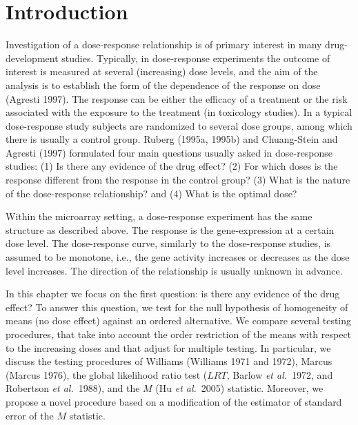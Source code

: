 \chapter{Introduction}
 \label{chap: intro}

Investigation of a dose-response relationship is of primary interest
in many drug-development studies. Typically, in dose-response
experiments the outcome of interest is measured at several
(increasing) dose levels, and the aim  of the analysis is to
establish the form of the dependence of the response on dose
(Agresti 1997). The response can be either the efficacy of a
treatment or the risk associated with the exposure to the treatment
(in toxicology studies). In a typical dose-response study subjects
are randomized to several dose groups, among which there is usually
a control group. Ruberg (1995a, 1995b) and Chuang-Stein and Agresti
(1997) formulated four main questions usually asked in dose-response
studies: (1) Is there any evidence of the drug effect? (2) For which
doses is the response different from the response in the control
group? (3) What is the nature of the dose-response relationship? and
(4) What is the optimal dose?

Within the microarray setting, a dose-response experiment has the
same structure as described above. The response is the
gene-expression at a certain dose level. The dose-response curve,
similarly to the dose-response studies, is assumed to be monotone,
i.e., the gene activity increases or decreases as the dose level
increases. The direction of the relationship is usually unknown in
advance.

In this chapter we focus on the first question: is there any
evidence of the drug effect? To answer this question, we test for
the null hypothesis of homogeneity of means (no dose effect) against
an ordered alternative. We compare several testing procedures, that
take into account the order restriction of the means with respect to
the increasing doses and that adjust for multiple testing. In
particular, we discuss the testing procedures of Williams (Williams
1971 and 1972), Marcus (Marcus 1976), the global likelihood ratio
test ($LRT$, Barlow \textit{et al.}\ 1972, and Robertson \textit{et
al.}\ 1988), and the $M$ (Hu \textit{et al.}\ 2005) statistic.
Moreover, we propose a novel procedure based on a modification of
the estimator of standard error of the $M$ statistic.


